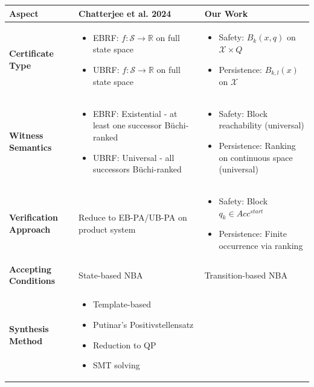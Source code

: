 \documentclass{article}
\begin{document}
\begin{enumerate}
\begin{center}
\begin{tabular}{|p{3.5cm}|p{5.5cm}|p{5.5cm}|}
\hline
\textbf{Aspect} & \textbf{Chatterjee et al. 2024} & \textbf{Our Work} \\
\hline
\textbf{Certificate Type} &
\begin{itemize}
\item EBRF: $f: \mathcal{S} \rightarrow \mathbb{R}$ on full state space
\item UBRF: $f: \mathcal{S} \rightarrow \mathbb{R}$ on full state space
\end{itemize} &
\begin{itemize}
\item Safety: $B_k(x,q)$ on $\mathcal{X} \times Q$
\item Persistence: $B_{k,l}(x)$ on $\mathcal{X}$
\end{itemize} \\
\hline
\textbf{Witness Semantics} &
\begin{itemize}
\item EBRF: Existential - at least one successor Büchi-ranked
\item UBRF: Universal - all successors Büchi-ranked
\end{itemize} &
\begin{itemize}
\item Safety: Block reachability (universal)
\item Persistence: Ranking on continuous space (universal)
\end{itemize} \\
\hline
\textbf{Verification Approach} & Reduce to EB-PA/UB-PA on product system &
\begin{itemize}
\item Safety: Block $q_k \in Acc^{start}$
\item Persistence: Finite occurrence via ranking
\end{itemize} \\
\hline
\textbf{Accepting Conditions} & State-based NBA & Transition-based NBA \\
\hline
\textbf{Synthesis Method} &
\begin{itemize}
\item Template-based
\item Putinar's Positivstellensatz
\item Reduction to QP
\item SMT solving
\end{itemize} &
\begin{itemize}

\end{itemize}
\end{tabular}
\end{center}
\end{enumerate}
\end{document}
